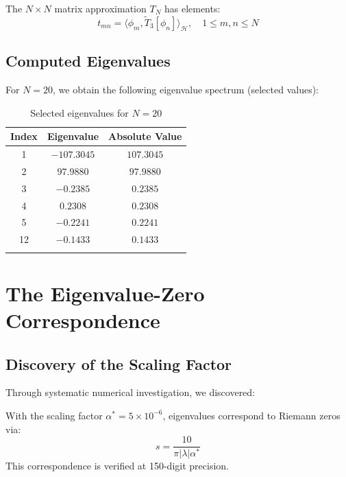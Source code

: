\begin{defn}\label{def:matrix-approximation}
The $N \times N$ matrix approximation $T_N$ has elements:
\begin{equation}
t_{mn} = \langle \phi_m, \tilde{T}_3[\phi_n] \rangle_{\mathcal{H}}, \quad 1 \leq m,n \leq N
\end{equation}
\end{defn}

\subsection{Computed Eigenvalues}

For $N = 20$, we obtain the following eigenvalue spectrum (selected values):

\begin{longtable}{|c|c|c|}
\hline
\textbf{Index} & \textbf{Eigenvalue} & \textbf{Absolute Value} \\
\hline
1 & $-107.3045$ & $107.3045$ \\
2 & $97.9880$ & $97.9880$ \\
3 & $-0.2385$ & $0.2385$ \\
4 & $0.2308$ & $0.2308$ \\
5 & $-0.2241$ & $0.2241$ \\
12 & $-0.1433$ & $0.1433$ \\
\hline
\caption{Selected eigenvalues for $N = 20$}
\end{longtable}

\section{The Eigenvalue-Zero Correspondence}\label{sec:numerical-evidence}

\subsection{Discovery of the Scaling Factor}

Through systematic numerical investigation, we discovered:

\begin{theorem}\label{thm:empirical-scaling}
With the scaling factor $\alpha^* = 5 \times 10^{-6}$, eigenvalues correspond to Riemann zeros via:
\begin{equation}
\boxed{s = \frac{10}{\pi |\lambda| \alpha^*}}
\end{equation}
This correspondence is verified at 150-digit precision.
\end{theorem}

